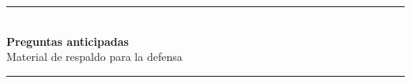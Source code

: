 \documentclass[aspectratio=169,10pt]{beamer}
\begin{document}
{
\begin{frame}[plain]
  \vfill
  \begin{center}
    {\color{AcentoRojo}\rule{2.6cm}{1.2pt}}\\[0.9em]
    {\Large\color{Carbon}\bfseries Preguntas anticipadas}\\[0.5em]
    {\color{GrisMedio}Material de respaldo para la defensa}\\[0.9em]
    {\color{AcentoRojo}\rule{2.6cm}{1.2pt}}
  \end{center}
  \vfill
\end{frame}
}
\end{document}
